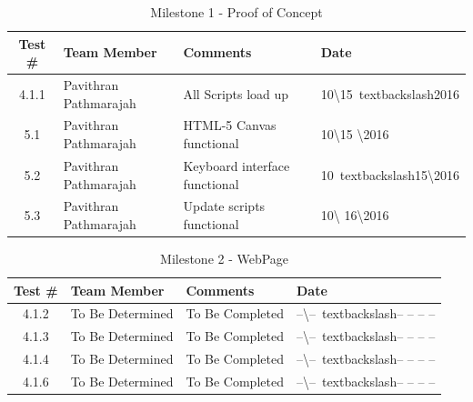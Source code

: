 \documentclass{article}
\begin{document}
\begin{table}[H]
\caption{Milestone 1 - Proof of Concept}
	\begin{tabularx}{\textwidth}{| c | l | X | l |}
	\toprule
	Test \#& Team Member &Comments &Date\\
	\midrule
	4.1.1 & Pavithran Pathmarajah & All Scripts load up & 10\textbackslash15\
	textbackslash2016\\
	5.1 & Pavithran Pathmarajah & HTML-5 Canvas functional & 10\textbackslash15
	\textbackslash2016\\
	5.2 & Pavithran Pathmarajah & Keyboard interface functional & 10\
	textbackslash15\textbackslash2016\\
	5.3 & Pavithran Pathmarajah & Update scripts functional & 10\textbackslash
	16\textbackslash2016\\
	\bottomrule
	\end{tabularx}
\end{table}

\begin{table}[H]
\caption{Milestone 2 - WebPage}
	\begin{tabularx}{\textwidth}{| c | l | X | l |}
	\toprule
	Test \#& Team Member &Comments &Date\\
	\midrule
	4.1.2 & To Be Determined & To Be Completed  & --\textbackslash--\
	textbackslash-- -- -- --\\
	4.1.3 & To Be Determined & To Be Completed & --\textbackslash--\
	textbackslash-- -- -- --\\
	4.1.4 & To Be Determined & To Be Completed & --\textbackslash--\
	textbackslash-- -- -- --\\
	4.1.6 & To Be Determined & To Be Completed & --\textbackslash--\
	textbackslash-- -- -- --\\
	\bottomrule
	\end{tabularx}
\end{table}
\end{document}
